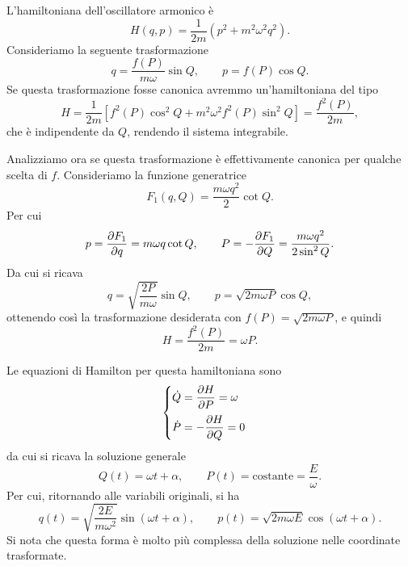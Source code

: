\begin{example} \label{ex:oscillatore-armonico-hamilton}
    L'hamiltoniana dell'oscillatore armonico è
    \begin{equation*}
        H(q, p) = \frac{1}{2m}(p^2 + m^2 \omega^2 q^2).
    \end{equation*}
    Consideriamo la seguente trasformazione
    \begin{equation*}
        q = \frac{f(P)}{m\omega} \sin Q, \qquad p = f(P) \cos Q .
    \end{equation*}
    Se questa trasformazione fosse canonica avremmo un'hamiltoniana del tipo
    \begin{equation*}
        H = \frac{1}{2m}\left[f^2(P) \cos^2 Q + m^2 \omega^2 f^2(P) \sin^2 Q\right] = \frac{f^2(P)}{2m},
    \end{equation*}
    che è indipendente da $Q$, rendendo il sistema integrabile.

    Analizziamo ora se questa trasformazione è effettivamente canonica per qualche scelta di $f$. Consideriamo la funzione generatrice
    \begin{equation*}
        F_1(q, Q) = \frac{m\omega q^2}{2}\cot Q.
    \end{equation*}
    Per cui
    \begin{equation*}
        p = \pdv{F_1}{q} = m\omega q \cot Q, \qquad P = -\pdv{F_1}{Q} = \frac{m\omega q^2}{2\sin^2 Q}.
    \end{equation*}
    Da cui si ricava
    \begin{equation*}
        q = \sqrt{\frac{2P}{m\omega}} \sin Q, \qquad p = \sqrt{2m\omega P} \cos Q,
    \end{equation*}
    ottenendo così la trasformazione desiderata con $f(P) = \sqrt{2m\omega P}$, e quindi
    \begin{equation*}
        H = \frac{f^2(P)}{2m} = \omega P.
    \end{equation*}

    Le equazioni di Hamilton per questa hamiltoniana sono
    \begin{equation*}
        \begin{cases}
            \displaystyle \dot{Q} = \pdv{H}{P} = \omega \\[0.3cm]
            \displaystyle \dot{P} = -\pdv{H}{Q} = 0
        \end{cases}
    \end{equation*}
    da cui si ricava la soluzione generale
    \begin{equation*}
        Q(t) = \omega t + \alpha, \qquad P(t) = \text{costante} = \frac{E}{\omega}.
    \end{equation*}
    Per cui, ritornando alle variabili originali, si ha
    \begin{equation*}
        q(t) = \sqrt{\frac{2E}{m\omega^2}} \sin(\omega t + \alpha), \qquad p(t) = \sqrt{2m\omega E} \cos(\omega t + \alpha).
    \end{equation*}
    Si nota che questa forma è molto più complessa della soluzione nelle coordinate trasformate.
\end{example}